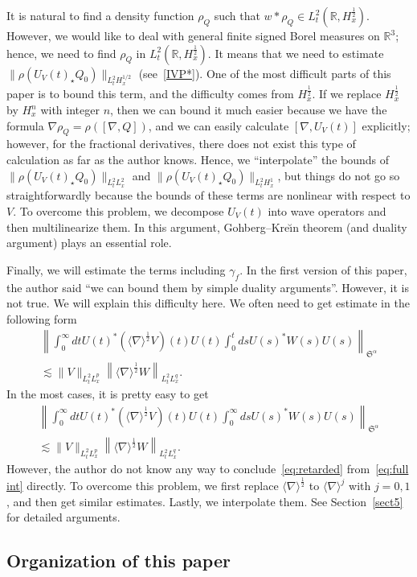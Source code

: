 \documentclass[10pt,a4paper]{amsart}
\providecommand{\No}[1]{\left\| #1 \right\|}
\newcommand{\BR}{\mathbb{R}}
\newcommand{\FS}{\mathfrak{S}}
\newcommand{\al}{\alpha}
\newcommand{\ga}{\gamma}
\newcommand{\rh}{\rho}
\renewcommand{\No}[1]{\left\| #1 \right\|}
\newcommand{\I}{\infty}
\newcommand{\sd}{\langle \nabla \rangle}
\newcommand{\st}{\star}
\newcommand{\R}{\mathbb{R}}
\newcommand{\tw}{\frac{1}{2}}
\newcommand{\na}{\nabla}
\newcommand{\ls}{\lesssim}
\begin{document}
It is natural to find a density function $\rh_Q$ such that $w \ast \rh_Q \in L^2_t(\BR,H^\tw_x)$. However, we would like to deal with general finite signed Borel measures on $\R^3$; hence, we need to find $\rh_Q$ in $L^2_t(\R,H^\tw_x)$. It means that we need to estimate $\|\rh(U_V(t)_\st Q_0)\|_{L^2_t H^{1/2}_x}$ (see~\eqref{IVP*}). One of the most difficult parts of this paper is to bound this term, and the difficulty comes from $H^\tw_x$. If we replace $H^\tw_x$ by $H^n_x$ with integer $n$, then we can bound it much easier because we have the formula $\na \rh_Q = \rh([\na,Q])$, and we can easily calculate $[\na,U_V(t)]$ explicitly; however, for the fractional derivatives, there does not exist this type of calculation as far as the author knows. Hence, we ``interpolate'' the bounds of $\|\rh(U_V(t)_\st Q_0)\|_{L^2_t L^2_x}$ and $\|\rh(U_V(t)_\st Q_0)\|_{L^2_t H^1_x}$, but things do not go so straightforwardly because the bounds of these terms are nonlinear with respect to $V$. To overcome this problem, we decompose $U_V(t)$ into wave operators and then multilinearize them. In this argument, Gohberg--Kre\u{\i}n theorem (and duality argument) plays an essential role.

Finally, we will estimate the terms including $\ga_f$. In the first version of this paper, the author said ``we can bound them by simple duality arguments''. However, it is not true. We will explain this difficulty here. We often need to get estimate in the following form
\begin{multline}\label{eq:retarded}
\No{\int_0^\I dt U(t)^* \left(\sd^\tw V\right)(t)U(t) \int_0^t ds U(s)^*W(s)U(s) }_{\FS^\al} \\
\ls \|V\|_{L^2_t L^p_x} \left\|\sd^\tw W\right\|_{L^2_t L^q_x}.
\end{multline}
In the most cases, it is pretty easy to get
\begin{multline}\label{eq:full int}
\No{\int_0^\I dt U(t)^* \left(\sd^\tw V\right)(t)U(t) \int_0^\I ds U(s)^*W(s)U(s) }_{\FS^\al} \\
\ls \|V\|_{L^2_t L^p_x} \left\|\sd^\tw W\right\|_{L^2_t L^q_x}.
\end{multline}
However, the author do not know any way to conclude~\eqref{eq:retarded} from~\eqref{eq:full int} directly. To overcome this problem, we first replace $\sd^\tw$ to $\sd^j$ with $j=0,1$, and then get similar estimates. Lastly, we interpolate them. See Section~\ref{sect5} for detailed arguments.



\subsection{Organization of this paper}
\end{document}
